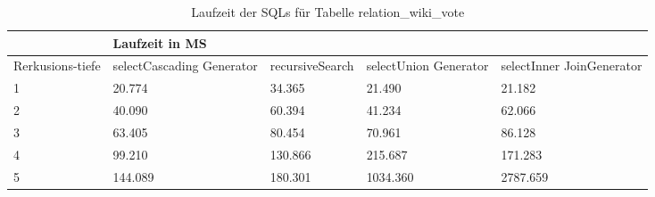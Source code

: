 \begin{table}[H]
	\begin{tabular}{l|l|l|l|l|l|}
		\cline{2-6}
		& \multicolumn{5}{|l|}{Laufzeit in MS}                                                                                                                                                  \\ \hline
		\multicolumn{1}{|l|}{\multirow{2}{2cm}{Rerkusions-tiefe}} & \multicolumn{2}{|l|}{\multirow{2}{3cm}{selectCascading Generator}} & \multirow{2}{2.8cm}{recursiveSearch} & \multirow{2}{2.5cm}{selectUnion Generator} & \multirow{2}{2.5cm}{selectInner JoinGenerator} \\
		\multicolumn{1}{|l|}{}
		& \multicolumn{2}{|l|}{}                                           &                                  &                                     &                                           \\ \hline
		
		\multicolumn{1}{|l|}{1}                                 & \multicolumn{2}{l|}{20.774}                                      & 34.365                                                & 21.490                                                    & 21.182                                                          \\ \hline
		\multicolumn{1}{|l|}{2}                                 & \multicolumn{2}{l|}{40.090}                                      & 60.394                                                & 41.234                                                    & 62.066                                                          \\ \hline
		\multicolumn{1}{|l|}{3}                                 & \multicolumn{2}{l|}{63.405}                                      & 80.454                                                & 70.961                                                    & 86.128                                                          \\ \hline
		\multicolumn{1}{|l|}{4}                                 & \multicolumn{2}{l|}{99.210}                                      & 130.866                                               & 215.687                                                   & 171.283                                                         \\ \hline
		\multicolumn{1}{|l|}{5}                                 & \multicolumn{2}{l|}{144.089}                                     & 180.301                                               & 1034.360                                                  & 2787.659                                                        \\ \hline
		
		
		
	\end{tabular}
	\caption{Laufzeit der SQLs für Tabelle relation\_wiki\_vote}
\end{table}

